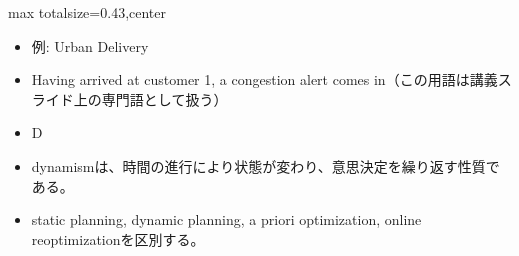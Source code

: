 \clearpage
{}
\begin{minipage}[t]{0.405\textwidth}
\begin{adjustbox}{max totalsize={\textwidth}{0.43\textheight},center}
\begin{minipage}{\textwidth}\scriptsize
{}\begin{itemize}
\item 例: Urban Delivery
\item Having arrived at customer 1, a congestion alert comes in（この用語は講義スライド上の専門語として扱う）
\item D
\end{itemize}\begin{itemize}
\item dynamismは、時間の進行により状態が変わり、意思決定を繰り返す性質である。
\item static planning, dynamic planning, a priori optimization, online reoptimizationを区別する。
\end{itemize}
\end{minipage}
\end{adjustbox}
\end{minipage}\hfill
